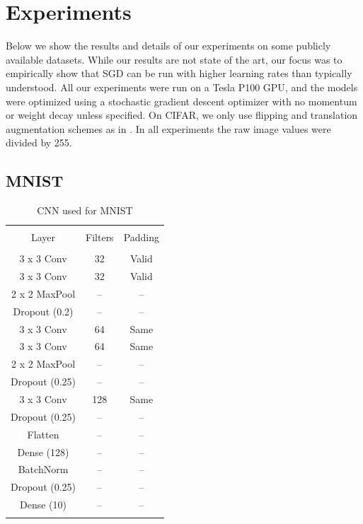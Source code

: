 \documentclass{article}
\begin{document}
\section{Experiments}
Below we show the results and details of our experiments on some publicly available datasets. While our results are not state of the art, our focus was to empirically show that SGD can be run with higher learning rates than typically understood. All our experiments were run on a Tesla P100 GPU, and the models were optimized using a stochastic gradient descent optimizer with no momentum or weight decay unless specified. On CIFAR, we only use flipping and translation augmentation schemes as in \cite{he2016deep}. In all experiments the raw image values were divided by 255.

\subsection{MNIST}
\begin{table}
    \centering
    \caption{CNN used for MNIST}
    \begin{tabular}{ccc}
        \toprule \\
        Layer & Filters & Padding \\
        \midrule \\
        3 x 3 Conv & 32 & Valid  \\
        3 x 3 Conv & 32 & Valid  \\
        2 x 2 MaxPool & -- & -- \\
        Dropout (0.2) & -- & -- \\
        3 x 3 Conv & 64 & Same \\
        3 x 3 Conv & 64 & Same \\
        2 x 2 MaxPool & -- & -- \\
        Dropout (0.25) & -- & -- \\
        3 x 3 Conv & 128 & Same \\
        Dropout (0.25) & -- & -- \\
        Flatten & -- & -- \\
        Dense (128) & -- & -- \\
        BatchNorm & -- & -- \\
        Dropout (0.25) & -- & -- \\
        Dense (10) & -- & -- \\
        \bottomrule \\
    \end{tabular}
    \label{tab:mnist:1}
\end{table}
\end{document}
